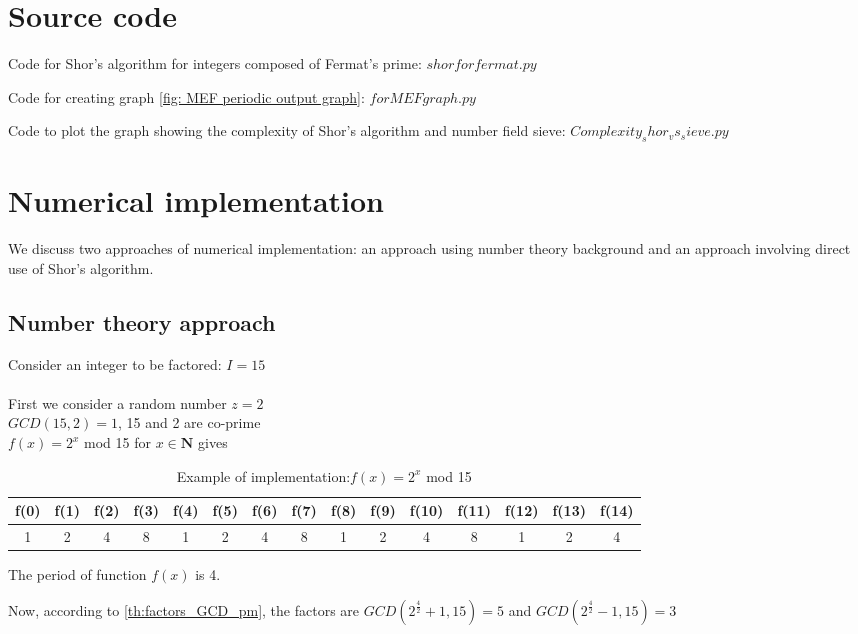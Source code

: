 \appendix
\section{Source code}
\UseRawInputEncoding
Code for Shor's algorithm for integers composed of Fermat's prime: $shorforfermat.py$



Code for creating graph \ref{fig: MEF periodic output graph}: $forMEFgraph.py$ 


Code to plot  the  graph   showing the complexity  of  Shor's algorithm  and  number  field  sieve: $Complexity_shor_vs_sieve.py$



\section{Numerical implementation}
We discuss two approaches of numerical implementation: an approach using number theory background and an approach involving direct use of Shor's algorithm.
\subsection{Number theory approach}
Consider an integer to be factored: $I = 15$
\\
\\ First we consider a random number $z=2$
\\ $GCD(15,2)=1$, 15 and 2 are co-prime
\\ $f(x) = 2^x$ mod 15 for $x\in \mathbf{N}$ gives
\\
\begin{table}[ht]
    \centering
\begin{tabular}{|c|c|c|c|c|c|c|c|c|c|c|c|c|c|c|}
\hline
f(0) & f(1) & f(2) & f(3) & f(4) & f(5) & f(6) & f(7) & f(8) & f(9) & f(10) & f(11) & f(12) & f(13) & f(14) \\ \hline
1  &2     & 4    & 8    & 1      &2  & 4    & 8    & 1   &2   & 4    & 8    & 1  &2   & 4       \\ \hline
\end{tabular}
 \caption{Example of implementation:$f(x) =2^x$ mod 15}
 \label{tab: Example of implementation:$f(x) =2^x$ mod 15}
\end{table}

The period of function $f(x)$ is 4.

Now, according to \ref{th:factors_GCD_pm}, the factors are $GCD(2^\frac{4}{2}+ 1, 15) = 5 $ and $GCD(2^\frac{4}{2}- 1,15)=3$

